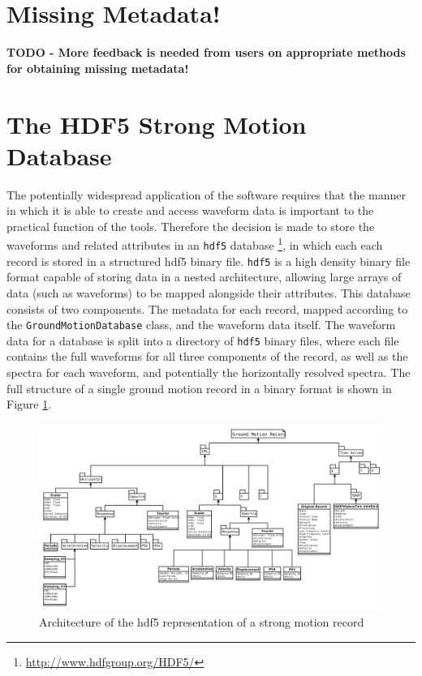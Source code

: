\section{Missing Metadata!}
\label{sec:missing_metadata}


\textbf{TODO - More feedback is needed from users on appropriate methods for obtaining missing metadata!}

\section{The HDF5 Strong Motion Database}
\label{sec:hdf5}

The potentially widespread application of the software requires that the manner in which it is able to create and access waveform data is important to the practical function of the tools. Therefore the decision is made to store the waveforms and related attributes in an \verb=hdf5= database \footnote{\href{http://www.hdfgroup.org/HDF5/}{http://www.hdfgroup.org/HDF5/}}, in which each each record is stored in a structured hdf5 binary file. \verb=hdf5= is a high density binary file format capable of storing data in a nested architecture, allowing large arrays of data (such as waveforms) to be mapped alongside their attributes. This database consists of two components. The metadata for each record, mapped according to the \verb=GroundMotionDatabase= class, and the waveform data itself. The waveform data for a database is split into a directory of \verb=hdf5= 
binary files, where each file contains the full waveforms for all three components of the record, as well as the spectra for each waveform, and potentially the horizontally resolved spectra. The full structure of a single ground motion record in a binary format is shown in Figure \ref{fig:sm_hdf5_model}.

\begin{figure}
	\centering
		\includegraphics[width=\textwidth]{./figures/database/sm_database_architecture.pdf}
	\caption{Architecture of the hdf5 representation of a strong motion record}
	\label{fig:sm_hdf5_model}
\end{figure}

